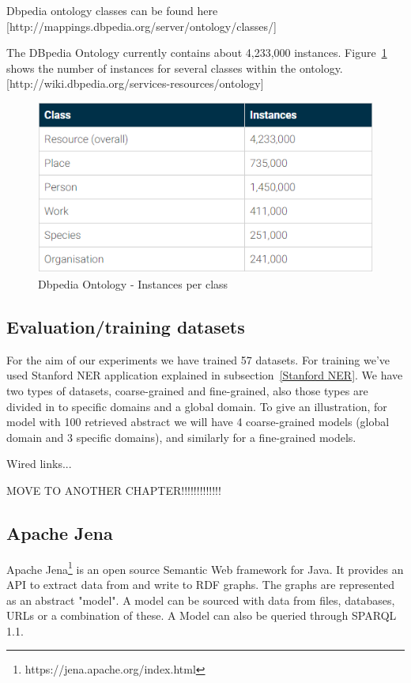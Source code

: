 \documentclass[thesis=M,english]{FITthesis}[2018/05/30]
\begin{document}
Dbpedia ontology classes can be found here [http://mappings.dbpedia.org/server/ontology/classes/]

The DBpedia Ontology currently contains about 4,233,000 instances. Figure~\ref{fig:Dbpedia-ontology} shows the number of instances for several classes within the ontology. [http://wiki.dbpedia.org/services-resources/ontology]

	\begin{figure}[H]\centering
		\includegraphics[width=\textwidth]{Dbpedia-ontology}
		\caption{Dbpedia Ontology - Instances per class}\label{fig:Dbpedia-ontology}
	\end{figure}

\subsection{Evaluation/training datasets}
For the aim of our experiments we have trained 57 datasets. For training we've used Stanford NER application explained in subsection~\ref{Stanford NER}. We have two types of datasets, coarse-grained and fine-grained, also those types are divided in to specific domains and a global domain. To give an illustration, for model with 100 retrieved abstract we will have 4 coarse-grained models (global domain and 3 specific domains), and similarly for a fine-grained models.

Wired links...

MOVE TO ANOTHER CHAPTER!!!!!!!!!!!!!

\subsection{Apache Jena}\label{ApacheJena}
Apache Jena\footnote{https://jena.apache.org/index.html} \cite{wiki:ApacheJena} is an open source Semantic Web framework for Java. It provides an API to extract data from and write to RDF graphs. The graphs are represented as an abstract "model". A model can be sourced with data from files, databases, URLs or a combination of these. A Model can also be queried through SPARQL 1.1.
\end{document}
